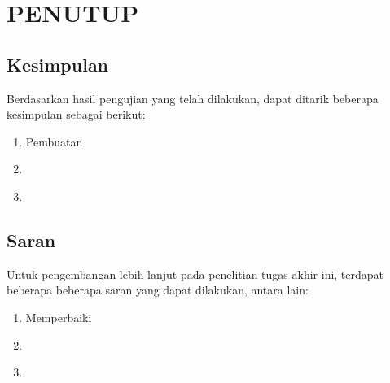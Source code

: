 \chapter{PENUTUP}
\label{chap:penutup}

\section{Kesimpulan}
\label{sec:kesimpulan}

Berdasarkan hasil pengujian yang telah dilakukan, dapat ditarik beberapa kesimpulan sebagai berikut:

\begin{enumerate}[nolistsep]

  \item Pembuatan \textcolor{red}{\lipsum[2][1-3]}

  \item \textcolor{red}{\lipsum[2][4-6]}

  \item \textcolor{red}{\lipsum[2][7-10]}

\end{enumerate}

\section{Saran}
\label{chap:saran}

Untuk pengembangan lebih lanjut pada penelitian tugas akhir ini, terdapat beberapa beberapa saran yang dapat dilakukan, antara lain:

\begin{enumerate}[nolistsep]

  \item Memperbaiki \textcolor{red}{\lipsum[2][1-3]}

  \item \textcolor{red}{\lipsum[2][4-6]}

  \item \textcolor{red}{\lipsum[2][7-10]}

\end{enumerate}

